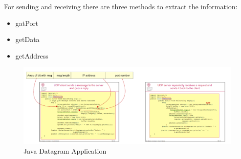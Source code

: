 For sending and receiving there are three methods to extract the information:
\begin{itemize}
    \item gatPort
    \item getData
    \item getAddress
\end{itemize}

\begin{figure}[!h]
    \centering
    \includegraphics[width=.9\linewidth]{images/InterprocessCommunicationImplementationDesign/datagramjava.png}
    \caption{Java Datagram Application}
\end{figure}
\newpage


